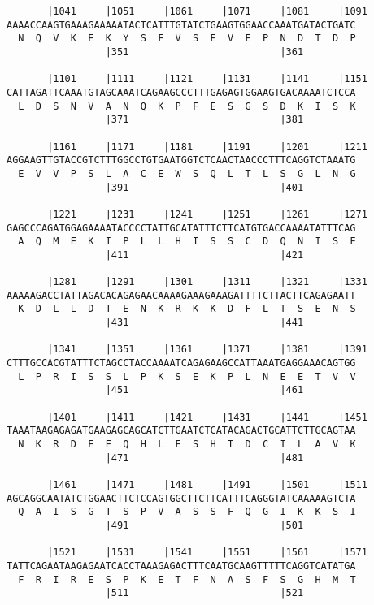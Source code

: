 \documentclass{article}
\begin{document}
\begin{Verbatim}
       |1041     |1051     |1061     |1071     |1081     |1091
AAAACCAAGTGAAAGAAAAATACTCATTTGTATCTGAAGTGGAACCAAATGATACTGATC
  N  Q  V  K  E  K  Y  S  F  V  S  E  V  E  P  N  D  T  D  P
                 |351                          |361         
  
       |1101     |1111     |1121     |1131     |1141     |1151
CATTAGATTCAAATGTAGCAAATCAGAAGCCCTTTGAGAGTGGAAGTGACAAAATCTCCA
  L  D  S  N  V  A  N  Q  K  P  F  E  S  G  S  D  K  I  S  K
                 |371                          |381         
  
       |1161     |1171     |1181     |1191     |1201     |1211
AGGAAGTTGTACCGTCTTTGGCCTGTGAATGGTCTCAACTAACCCTTTCAGGTCTAAATG
  E  V  V  P  S  L  A  C  E  W  S  Q  L  T  L  S  G  L  N  G
                 |391                          |401         
  
       |1221     |1231     |1241     |1251     |1261     |1271
GAGCCCAGATGGAGAAAATACCCCTATTGCATATTTCTTCATGTGACCAAAATATTTCAG
  A  Q  M  E  K  I  P  L  L  H  I  S  S  C  D  Q  N  I  S  E
                 |411                          |421         
  
       |1281     |1291     |1301     |1311     |1321     |1331
AAAAAGACCTATTAGACACAGAGAACAAAAGAAAGAAAGATTTTCTTACTTCAGAGAATT
  K  D  L  L  D  T  E  N  K  R  K  K  D  F  L  T  S  E  N  S
                 |431                          |441         
  
       |1341     |1351     |1361     |1371     |1381     |1391
CTTTGCCACGTATTTCTAGCCTACCAAAATCAGAGAAGCCATTAAATGAGGAAACAGTGG
  L  P  R  I  S  S  L  P  K  S  E  K  P  L  N  E  E  T  V  V
                 |451                          |461         
  
       |1401     |1411     |1421     |1431     |1441     |1451
TAAATAAGAGAGATGAAGAGCAGCATCTTGAATCTCATACAGACTGCATTCTTGCAGTAA
  N  K  R  D  E  E  Q  H  L  E  S  H  T  D  C  I  L  A  V  K
                 |471                          |481         
  
       |1461     |1471     |1481     |1491     |1501     |1511
AGCAGGCAATATCTGGAACTTCTCCAGTGGCTTCTTCATTTCAGGGTATCAAAAAGTCTA
  Q  A  I  S  G  T  S  P  V  A  S  S  F  Q  G  I  K  K  S  I
                 |491                          |501         
  
       |1521     |1531     |1541     |1551     |1561     |1571
TATTCAGAATAAGAGAATCACCTAAAGAGACTTTCAATGCAAGTTTTTCAGGTCATATGA
  F  R  I  R  E  S  P  K  E  T  F  N  A  S  F  S  G  H  M  T
                 |511                          |521         
  

\end{Verbatim}
\end{document}
